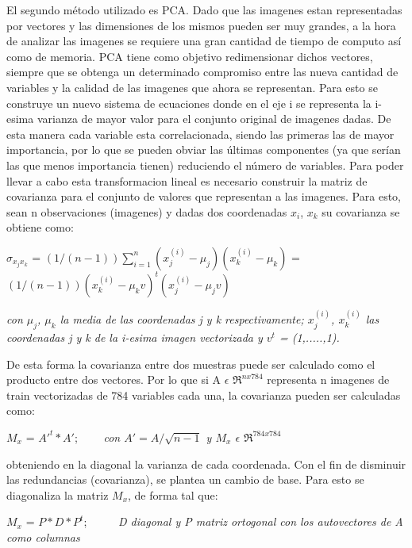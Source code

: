 El segundo método utilizado es PCA. Dado que las imagenes estan representadas por vectores y las dimensiones de los mismos pueden ser muy grandes, a la hora de analizar las imagenes se requiere una gran cantidad de tiempo de computo así como de memoria. PCA tiene como objetivo redimensionar dichos vectores, siempre que se obtenga un determinado compromiso entre las nueva cantidad de variables y la calidad de las imagenes que ahora se representan. Para esto se construye un nuevo sistema de ecuaciones donde en el eje i se representa la i-esima varianza de mayor valor para el conjunto original de imagenes dadas. De esta manera cada variable esta correlacionada, siendo las primeras las de mayor importancia, por lo que se pueden obviar las últimas componentes (ya que serían las que menos importancia tienen) reduciendo el número de variables. Para poder llevar a cabo esta transformacion lineal es necesario construir la matriz de covarianza para el conjunto de valores que representan a las imagenes.
Para esto, sean n observaciones (imagenes) y dadas dos coordenadas $x_i$, $x_k$ su covarianza se obtiene como: \newline


$\sigma_{x_j x_k}$ = $(1/(n-1))\sum_{i=1}^{n}(x_{j}^{(i)}-\mu_j)(x_{k}^{(i)}-\mu_k)$  = $(1/(n-1))(x_{k}^{(i)}-\mu_kv)^{t}(x_{j}^{(i)}-\mu_jv)$ \newline

\textit{con $\mu_j$, $\mu_k$ la media de las coordenadas j y k respectivamente; $x_{j}^{(i)}$, $x_{k}^{(i)}$ las coordenadas j y k de la i-esima imagen vectorizada y $v^{t}$ = (1,.....,1).}\newline

De esta forma la covarianza entre dos muestras puede ser calculado como el producto entre dos vectores. Por lo que si A $\epsilon$ $\Re^{nx784}$ representa n imagenes de train vectorizadas de 784 variables cada una, la covarianza pueden ser calculadas como:\newline

 $M_x$ = $A'^{t}*A'$; \ \ \ \ \textit {con $A'=A/\sqrt{n-1}$ y $M_x$ $\epsilon$  $\Re^{784x784}$} \newline

obteniendo en la diagonal la varianza de cada coordenada. Con el fin de disminuir las redundancias (covarianza), se plantea un cambio de base. Para esto se diagonaliza la matriz $M_x$, de forma tal que: \newline

 $M_x$ = $P*D*P^{t}$; \ \ \ \ \ \textit{D diagonal y P matriz ortogonal con los autovectores de A como columnas} \newline%
 
